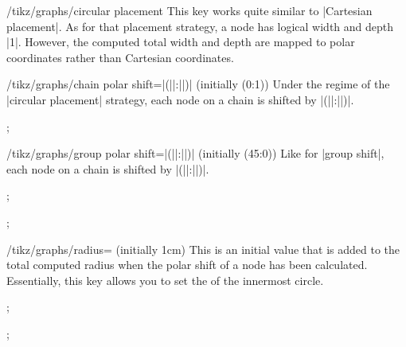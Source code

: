 \begin{key}{/tikz/graphs/circular placement}
    This key works quite similar to |Cartesian placement|. As for that
    placement strategy, a node has logical width and depth |1|. However, the
    computed total width and depth are mapped to polar coordinates rather than
    Cartesian coordinates.

    \begin{key}{/tikz/graphs/chain polar shift=|(||:||)| (initially {(0:1)})}
        Under the regime of the |circular placement| strategy, each node on a
        chain is shifted by
        |(||:||)|.
\begin{codeexample}[]
\tikz {};
\end{codeexample}
    \end{key}
    \begin{key}{/tikz/graphs/group polar shift=|(||:||)| (initially {(45:0)})}
        Like for |group shift|, each node on a chain is shifted by
        |(||:||)|.
\begin{codeexample}[]
\tikz {};
\end{codeexample}
\begin{codeexample}[]
\tikz {};
\end{codeexample}
    \end{key}
    \begin{key}{/tikz/graphs/radius= (initially 1cm)}
        This is an initial value that is added to the total computed radius
        when the polar shift of a node has been calculated. Essentially, this
        key allows you to set the  of the innermost circle.
\begin{codeexample}[]
\tikz {};
\end{codeexample}
\begin{codeexample}[]
\tikz {};
\end{codeexample}
    \end{key}

\end{key}

